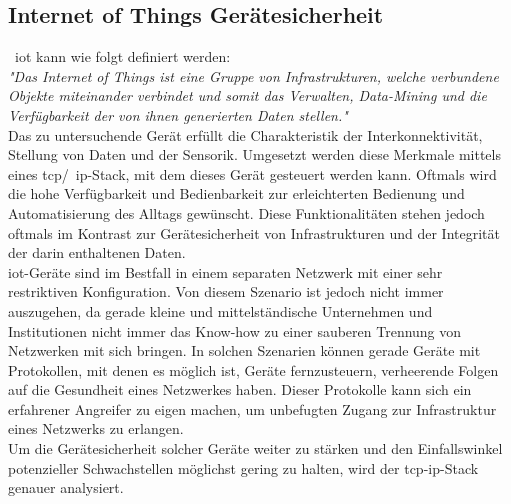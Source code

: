 \subsection{Internet of Things Gerätesicherheit}\label{subsec:internet-of-things-als-trusted-network}
~\gls{iot} kann wie folgt definiert werden: \\
\textit{"Das Internet of Things ist eine Gruppe von Infrastrukturen, welche verbundene Objekte miteinander verbindet und somit das
Verwalten, Data-Mining und die Verfügbarkeit der von ihnen generierten Daten stellen."}\cite[vgl.][2]{iot-definition} \\
\linebreak
Das zu untersuchende Gerät erfüllt die Charakteristik der Interkonnektivität, Stellung von Daten und der Sensorik.
Umgesetzt werden diese Merkmale mittels eines \gls{tcp}/~\gls{ip}-Stack, mit dem dieses Gerät gesteuert werden kann.
Oftmals wird die hohe Verfügbarkeit und Bedienbarkeit zur erleichterten Bedienung und Automatisierung des Alltags gewünscht.
Diese Funktionalitäten stehen jedoch oftmals im Kontrast zur Gerätesicherheit von Infrastrukturen und
der Integrität der darin enthaltenen Daten.\\
\linebreak
\gls{iot}-Geräte sind im Bestfall in einem separaten Netzwerk mit einer sehr restriktiven Konfiguration.
Von diesem Szenario ist jedoch nicht immer auszugehen, da gerade kleine und mittelständische Unternehmen und
Institutionen nicht immer das Know-how zu einer sauberen Trennung von Netzwerken mit sich bringen.
In solchen Szenarien können gerade Geräte mit Protokollen, mit denen es möglich ist, Geräte fernzusteuern, verheerende Folgen
auf die Gesundheit eines Netzwerkes haben.
Dieser Protokolle kann sich ein erfahrener Angreifer zu eigen machen, um unbefugten Zugang zur Infrastruktur eines Netzwerks
zu erlangen.\\
\linebreak
Um die Gerätesicherheit solcher Geräte weiter zu stärken und den Einfallswinkel potenzieller Schwachstellen möglichst
gering zu halten, wird der \gls{tcp}-\gls{ip}-Stack genauer analysiert.
